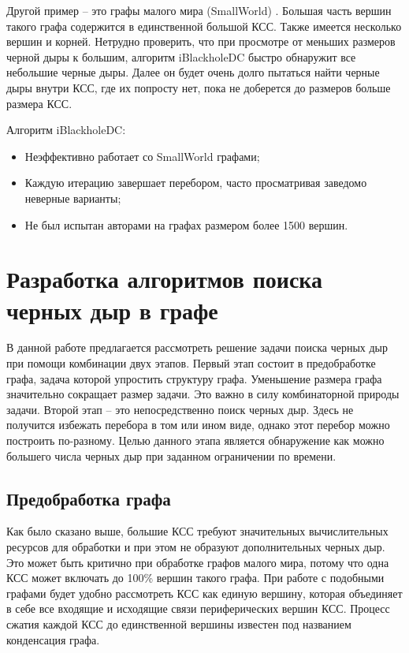 \documentclass[12pt,a4paper,oneside,openany]{article}
\theoremstyle{definition}
\theoremstyle{lemma}
\theoremstyle{remark}
\begin{document}
Другой пример -- это графы малого мира (SmallWorld) \cite{watts1999networks}.
Большая часть вершин такого графа содержится в единственной большой КСС.
Также имеется несколько вершин и корней.
Нетрудно проверить, что при просмотре от меньших размеров черной дыры к большим,
алгоритм iBlackholeDC быстро обнаружит все небольшие черные дыры.
Далее он будет очень долго пытаться найти черные дыры внутри КСС,
где их попросту нет, пока не доберется до размеров больше размера КСС.

Алгоритм iBlackholeDC:
    \begin{itemize}
        \item Неэффективно работает со SmallWorld графами;
        \item Каждую итерацию завершает перебором, часто просматривая заведомо неверные варианты;
        \item Не был испытан авторами на графах размером более 1500 вершин.
    \end{itemize}

\cleardoublepage
\section{Разработка алгоритмов поиска черных дыр в графе}\label{sec:topalgodesign}

В данной работе предлагается рассмотреть решение задачи поиска черных дыр при помощи комбинации двух этапов.
Первый этап состоит в предобработке графа, задача которой упростить структуру графа.
Уменьшение размера графа значительно сокращает размер задачи. Это важно в силу комбинаторной природы задачи.
Второй этап -- это непосредственно поиск черных дыр. Здесь не получится избежать перебора в том или ином виде,
однако этот перебор можно построить по-разному.
Целью данного этапа является обнаружение как можно большего числа черных дыр при заданном ограничении по времени.

\subsection{Предобработка графа}\label{subsec:graphpreprocessing}

Как было сказано выше, большие КСС требуют значительных вычислительных ресурсов для обработки и при этом не образуют дополнительных черных дыр.
Это может быть критично при обработке графов малого мира, потому что одна КСС может включать до 100\% вершин такого графа.
При работе с подобными графами будет удобно рассмотреть КСС как единую вершину,
которая объединяет в себе все входящие и исходящие связи периферических вершин КСС.
Процесс сжатия каждой КСС до единственной вершины известен под названием конденсация графа.
\end{document}
